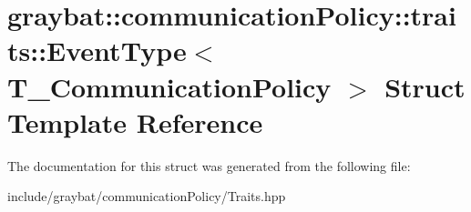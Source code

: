 \hypertarget{structgraybat_1_1communicationPolicy_1_1traits_1_1EventType}{}\section{graybat\+:\+:communication\+Policy\+:\+:traits\+:\+:Event\+Type$<$ T\+\_\+\+Communication\+Policy $>$ Struct Template Reference}
\label{structgraybat_1_1communicationPolicy_1_1traits_1_1EventType}


The documentation for this struct was generated from the following file\+:\begin{DoxyCompactItemize}
\item 
include/graybat/communication\+Policy/Traits.\+hpp\end{DoxyCompactItemize}
